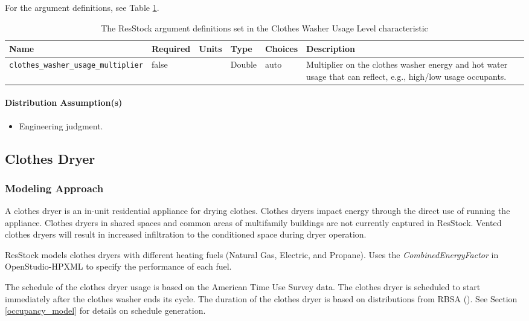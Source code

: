 For the argument definitions, see Table \ref{table:hc_arg_def_clothes_washer_usage_level}. 

\begin{longtable}[]{ |p{}|p{1.5cm}|p{1cm}|p{1.1cm}|p{3.4cm}|p{4cm}| }
\caption{The ResStock argument definitions set in the Clothes Washer Usage Level characteristic} \label{table:hc_arg_def_clothes_washer_usage_level}\\
\toprule\noalign{}
Name & Required & Units & Type & Choices & Description \\
\midrule\noalign{}
\endhead
\bottomrule\noalign{}
\endlastfoot
\texttt{clothes\_washer\_usage\_multiplier} & false & & Double & auto &
Multiplier on the clothes washer energy and hot water usage that can
reflect, e.g., high/low usage occupants.  \\
\end{longtable}
\paragraph{Distribution Assumption(s)}
\begin{itemize}
\item 
Engineering judgment.
\end{itemize}

\subsection{Clothes Dryer}
\subsubsection{Modeling Approach}
A clothes dryer is an in-unit residential appliance for drying clothes. Clothes dryers impact energy through the direct use of running the appliance. Clothes dryers in shared spaces and common areas of multifamily buildings are not currently captured in ResStock. Vented clothes dryers will result in increased infiltration to the conditioned space during dryer operation.

ResStock models clothes dryers with different heating fuels (Natural Gas, Electric, and Propane). Uses the \textit{CombinedEnergyFactor} in OpenStudio-HPXML to specify the performance of each fuel.

The schedule of the clothes dryer usage is based on the American Time Use Survey data. The clothes dryer is scheduled to start immediately after the clothes washer ends its cycle. The duration of the clothes dryer is based on distributions from RBSA (\cite{RBSA}). See Section \ref{occupancy_model} for details on schedule generation.

